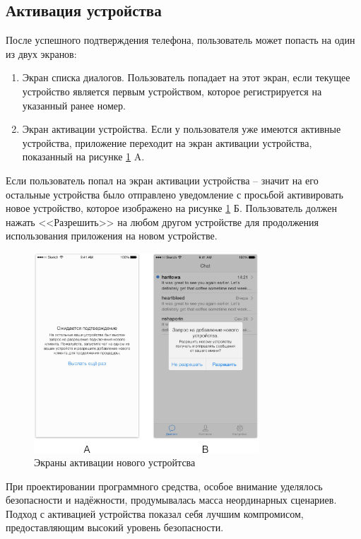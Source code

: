 \subsection{Активация устройства}
\label{sec:usage:deviceactivation}

После успешного подтверждения телефона, пользователь может попасть на один из двух экранов:

\begin{enumerate}
	\item Экран списка диалогов. Пользователь попадает на этот экран, если текущее устройство является первым устройством, которое регистрируется на указанный ранее номер.
	\item Экран активации устройства. Если у пользователя уже имеются активные устройства, приложение переходит на экран активации устройства, показанный на рисунке \ref{sec:usage:deviceactivation:ui} A.
\end{enumerate}

Если пользователь попал на экран активации устройства -- значит на его остальные устройства было отправлено уведомление с просьбой активировать новое устройство, которое изображено на рисунке \ref{sec:usage:deviceactivation:ui} Б. Пользователь должен нажать <<Разрешить>> на любом другом устройстве для продолжения использования приложения на новом устройстве.

\begin{figure}[h]
  \centering
    \includegraphics[width=0.75\textwidth]{inc/img/ui/ui_approve.jpg}
  \caption{Экраны активации нового устройтсва}
  \label{sec:usage:deviceactivation:ui}
\end{figure}

При проектировании программного средства, особое внимание уделялось безопасности и надёжности, продумывалась масса неординарных сценариев. Подход с активацией устройства показал себя лучшим компромисом, предоставляющим высокий уровень безопасности.